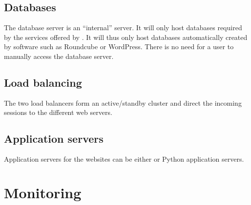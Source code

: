\documentclass[a4paper,12pt,twoside]{scrartcl}
\begin{document}
\subsection{Databases}
The database server is an ``internal'' server.
It will only host databases required by the services offered by .
It will thus only host databases automatically created by software such as Roundcube or WordPress.
There is no need for a user to manually access the database server.

\subsection{Load balancing}
The two load balancers form an active/standby cluster and direct the incoming sessions to the different web servers.

\subsection{Application servers}
Application servers for the websites can be either  or Python application servers.


\section{Monitoring}
\label{sec:monitoring}
\end{document}
